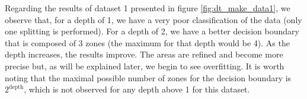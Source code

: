 Regarding the results of dataset 1 presented in figure \ref{fig:dt_make_data1}, we observe that, for a depth of 1, we have a very poor classification of the data (only one splitting is performed). For a depth of 2, we have a better decision boundary that is composed of 3 zones (the maximum for that depth would be 4). As the depth increases, the results improve. The areas are refined and become more precise but, as will be explained later, we begin to see overfitting. It is worth noting that the maximal possible number of zones for the decision boundary is $2^{\text{depth}}$, which is not observed for any depth above 1 for this dataset.

